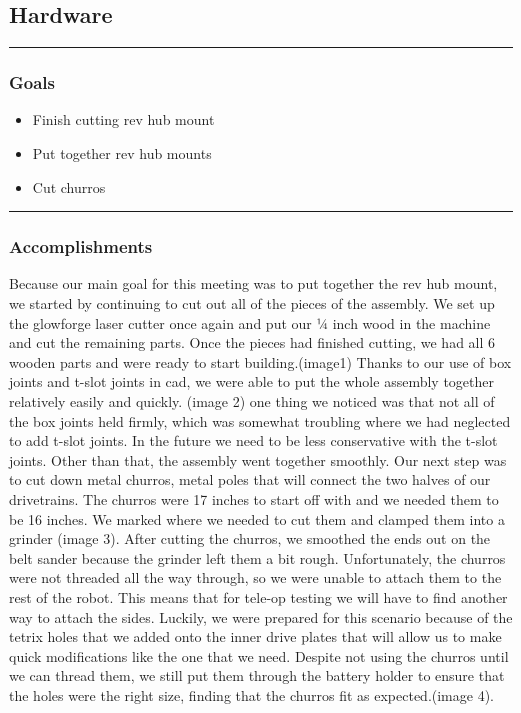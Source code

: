 \subsection*{Hardware}
\noindent\hfil\rule{\textwidth}{.4pt}\hfil
\subsubsection*{Goals}
\begin{itemize}
    \item Finish cutting rev hub mount
	\item Put together rev hub mounts
	\item Cut churros
  

\end{itemize} 

\noindent\hfil\rule{\textwidth}{.4pt}\hfil

\subsubsection*{Accomplishments}
Because our main goal for this meeting was to put together the rev hub mount, we started by continuing to cut out all of the pieces of the assembly. We set up the glowforge laser cutter once again and put our ¼ inch wood in the machine and cut the remaining parts. Once the pieces had finished cutting, we had all 6 wooden parts and were ready to start building.(image1)
Thanks to our use of box joints and t-slot joints in cad, we were able to put the whole assembly together relatively easily and quickly. (image 2) one thing we noticed was that not all of the box joints held firmly, which was somewhat troubling where we had neglected to add t-slot joints. In the future we need to be less conservative with the t-slot joints. Other than that, the assembly went together smoothly. 
Our next step was to cut down metal churros, metal poles that will connect the two halves of our drivetrains. The churros were 17 inches to start off with and we needed them to be 16 inches. We marked where we needed to cut them and clamped them into a grinder (image 3). After cutting the churros, we smoothed the ends out on the belt sander because the grinder left them a bit rough. Unfortunately, the churros were not threaded all the way through, so we were unable to attach them to the rest of the robot. This means that for tele-op testing we will have to find another way to attach the sides. Luckily, we were prepared for this scenario because of the tetrix holes that we added onto the inner drive plates that will allow us to make quick modifications like the one that we need. Despite not using the churros until we can thread them, we still put them through the battery holder to ensure that the holes were the right size, finding that the churros fit as expected.(image 4). 

